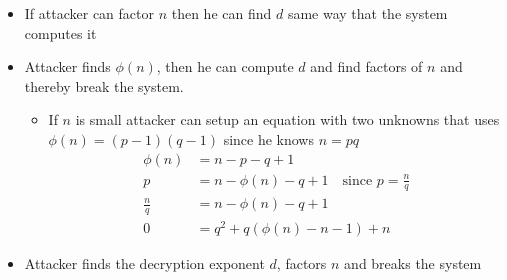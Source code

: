 
\begin{itemize}
\item If attacker can factor $n$ then he can find $d$ same way that
    the system computes it
\item Attacker finds $\phi (n)$, then he can compute $d$ and find factors of $n$ and thereby break the system.
  \begin{itemize}
  \item If $n$ is small attacker can setup an equation with two unknowns
    that uses $\phi (n)=(p-1)(q-1)$ since he knows $n=pq$
    \begin{align*}
      \phi(n) &= n - p - q + 1 \\
      p &= n - \phi(n) - q + 1 \quad \text{since } p = \frac{n}{q} \\
      \frac{n}{q} &= n - \phi(n) - q + 1 \\
      0 &= q^2 + q(\phi(n) - n - 1) + n
    \end{align*}
  \end{itemize}
\item Attacker finds the decryption exponent $d$, factors $n$ and breaks the system
\end{itemize}